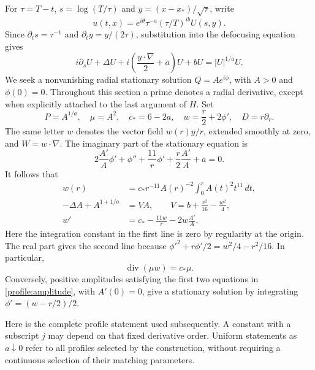 \documentclass[11pt]{article}
\numberwithin{equation}{section}
\theoremstyle{definition}
\theoremstyle{remark}
\begin{document}
For $\tau=T-t$, $s=\log(T/\tau)$ and
$y=(x-x_*)/\sqrt\tau$, write
\[
 u(t,x)=e^{i\theta}\tau^{-a}(\tau/T)^{ib}U(s,y).
\]
Since $\partial_t s=\tau^{-1}$ and
$\partial_t y=y/(2\tau)$, substitution into the defocusing equation gives
\begin{equation}\label{profile:similarity}
 i\partial_sU+\Delta U+i\left(\frac{y\cdot\nabla}{2}+a\right)U+bU
       =|U|^{1/a}U.
\end{equation}
We seek a nonvanishing radial stationary solution $Q=Ae^{i\phi}$, with
$A>0$ and $\phi(0)=0$.  Throughout this section a prime denotes a radial
derivative, except when explicitly attached to the last argument of $H$.
Set
\begin{equation}\label{profile:notation}
 P=A^{1/a},\quad \mu=A^2,\quad c_*=6-2a,\quad
 w=\frac r2+2\phi',\quad D=r\partial_r.
\end{equation}
The same letter $w$ denotes the vector field $w(r)y/r$, extended smoothly
at zero, and $W=w\cdot\nabla$.  The imaginary part of the stationary
equation is
\[
 2\frac{A'}A\phi'+\phi''+\frac{11}{r}\phi'
       +\frac r2\frac{A'}A+a=0.
\]
It follows that
\begin{equation}\label{profile:amplitude}
 \begin{split}
 w(r)&=c_*r^{-11}A(r)^{-2}\int_0^r A(t)^2t^{11}\,dt,\\
 -\Delta A+A^{1+1/a}&=VA,\qquad
 V=b+\frac{r^2}{16}-\frac{w^2}{4},\\
 w'&=c_*-\frac{11w}{r}-2w\frac{A'}A.
 \end{split}
\end{equation}
Here the integration constant in the first line is zero by regularity at
the origin.  The real part gives the second line because
$\phi'^2+r\phi'/2=w^2/4-r^2/16$.  In particular,
\begin{equation}\label{profile:divergence}
 \operatorname{div}(\mu w)=c_*\mu.
\end{equation}
Conversely, positive amplitudes satisfying the first two equations in
\eqref{profile:amplitude}, with $A'(0)=0$, give a stationary solution by
integrating $\phi'=(w-r/2)/2$.

Here is the complete profile statement used subsequently.  A constant
with a subscript $j$ may depend on that fixed derivative order.  Uniform
statements as $a\downarrow0$ refer to all profiles selected by the
construction, without requiring a continuous selection of their matching
parameters.
\end{document}
